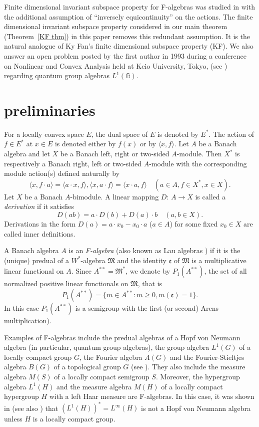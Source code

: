 \documentclass{tran-l}
\numberwithin{equation}{section}
\theoremstyle{definition}
\theoremstyle{remark}
\begin{document}
Finite dimensional invariant subspace property for F-algebras was studied in \cite{L-W 88} with the additional assumption of ``inversely equicontinuity'' on the actions. The finite dimensional invariant subspace property considered in our main theorem (Theorem~\ref{KF thm}) in this paper removes this redundant assumption. It is the natural analogue of Ky Fan's finite dimensional subspace property (KF). We also answer an open problem posted by the first author in 1993 during a conference on Nonlinear and Convex Analysis held at Keio University, Tokyo, (see \cite[Problem 5]{Lau_Tokyo}) regarding quantum group algebras $L^1({\mathbb G})$.

\section{preliminaries}\label{sec 2}

For a locally convex space $E$, the dual space of $E$ is denoted by $E^*$. The action of $f\in E^*$ at $x\in E$ is denoted either by $f(x)$ or by ${\langle} x,f{\rangle}$. Let $A$ be a Banach algebra and let $X$ be a Banach left, right or two-sided $A$-module. Then $X^*$ is respectively a Banach right, left or two-sided $A$-module with the corresponding module action(s) defined naturally by 
\[
{\langle} x, f\cdot a{\rangle} = {\langle} a\cdot x, f{\rangle}, {\langle} x, a\cdot f{\rangle} = {\langle} x\cdot a, f{\rangle} \quad (a\in A, f\in X^*, x\in X).
\]
Let $X$ be a Banach $A$-bimodule. A linear mapping $D$: $A\to X$ is called a \emph{derivation} if it satisfies
\[
 D(ab) = a\cdot D(b) + D(a)\cdot b \quad (a,b\in X).
 \]
 Derivations in the form $D(a) = a\cdot x_0 - x_0\cdot a$ ($a\in A$) for some fixed $x_0\in X$ are called inner definitions.
 

A Banach algebra $A$ is an \emph{F-algebra} \cite{Lau_F} (also known as Lau algebras \cite{Pier}) if it is the (unique) predual of a $W^*$-algebra $ {\mathfrak{M}}$ and the identity ${\mathfrak{e}}$ of $ {\mathfrak{M}}$ is a multiplicative linear functional on $A$.  Since $A^{**} =  {\mathfrak{M}}^*$, we denote by $P_1(A^{**})$, the set of all normalized positive linear functionals on $ {\mathfrak{M}}$, that is 
\[
P_1(A^{**}) =\{m\in A^{**}: m\geq 0, m({\mathfrak{e}}) =1\}.
\]
In this case $P_1(A^{**})$ is a semigroup with the first (or second) Arens multiplication).

 Examples of F-algebras include the predual algebras of a Hopf von Neumann algebra (in particular, quantum group algebras), the group algebra $L^1(G)$ of a locally compact group $G$, the Fourier algebra $A(G)$ and the Fourier-Stieltjes algebra $B(G)$ of a topological group $G$ (see \cite{D-L-S, Lau_F, Lau-Ludwig}). They also include the measure algebra $M(S)$ of a locally compact semigroup $S$. Moreover, the hypergroup algebra $L^1(H)$ and the measure algebra $M(H)$ of a locally compact hypergroup $H$ with a left Haar measure are F-algebras. In this case, it was shown in \cite[Theorem~5.2.2]{Willson} (see also \cite[Remark~5.3]{Willson2}) that $(L^1(H))^*=L^\infty(H)$ is not a Hopf von Neumann algebra unless $H$ is a locally compact group.
\end{document}
